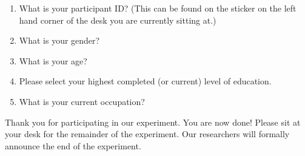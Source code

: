 \documentclass[USenglish,oneside,twocolumn]{article}
\begin{document}
\begin{enumerate}
\item{What is your participant ID? (This can be found on the sticker on the left hand corner of the desk you are currently sitting at.)}
\item{What is your gender?}
\item{What is your age?}
\item{Please select your highest completed (or current) level of education}.
\item{What is your current occupation?}  
\end{enumerate}

Thank you for participating in our experiment. You are now done! Please sit at your desk for the remainder of the experiment. Our researchers will formally announce the end of the experiment. 
\end{document}
